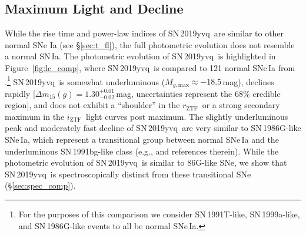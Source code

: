 \documentclass[twocolumn]{aastex63}
\newcommand{\rztf}{$r_\mathrm{ZTF}$}
\newcommand{\iztf}{$i_\mathrm{ZTF}$}
\newcommand{\sn}{SN\,2019yvq}
\begin{document}
\subsection{Maximum Light and Decline}\label{sec:max_decline}

While the rise time and power-law indices of \sn\ are similar to other normal
SNe Ia (see \S\ref{sec:t_fl}), the full photometric evolution does not
resemble a normal SN\,Ia. The photometric evolution of \sn\ is highlighted in
Figure~\ref{fig:lc_comp}, where \sn\ is compared to 121 normal SNe\,Ia from
\citet{Yao19}.\footnote{For the purposes of this comparison we consider
SN\,1991T-like, SN\,1999a-like, and SN\,1986G-like events to all be normal
SNe\,Ia.} \sn\ is somewhat underluminous ($M_{g,\mathrm{max}} \approx
-18.5$\,mag), declines rapidly [$\Delta m_{15}(g) =
1.30^{+0.01}_{-0.02}$\,mag, uncertainties represent the 68\% credible region],
and does not exhibit a ``shoulder'' in the \rztf\ or a strong secondary
maximum in the \iztf\ light curves post maximum. The slightly underluminous
peak and moderately fast decline of \sn\ are very similar to SN\,1986G-like
SNe\,Ia, which represent a transitional group between normal SNe\,Ia and the
underluminous SN\,1991bg-like class (e.g., \citealt{Taubenberger17} and
references therein). While the photometric evolution of \sn\ is similar to
86G-like SNe, we show that \sn\ is spectroscopically distinct from these
transitional SNe (\S\ref{sec:spec_comp}).
\end{document}
